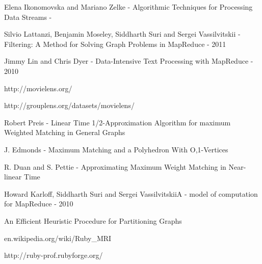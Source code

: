  \begin{thebibliography}{99}

  Elena Ikonomovska and Mariano Zelke - Algorithmic Techniques for Processing Data Streams -

  Silvio Lattanzi, Benjamin Moseley, Siddharth Suri and Sergei Vassilvitskii -Filtering: A Method for Solving Graph Problems in MapReduce - 2011
  
  Jimmy Lin and Chris Dyer - Data-Intensive Text Processing with MapReduce - 2010
  
  http://movielens.org/
  
  http://grouplens.org/datasets/movielens/
  
  Robert Preis - Linear Time 1/2-Approximation Algorithm for maximum Weighted Matching in General Graphs
  
  J. Edmonds - Maximum Matching and a Polyhedron With O,1-Vertices

  R. Duan and S. Pettie - Approximating Maximum Weight Matching in Near-linear Time

  Howard Karloff, Siddharth Suri and Sergei VassilvitskiiA -  model of computation for MapReduce - 2010

  An Efficient Heuristic Procedure for Partitioning Graphs
  
  en.wikipedia.org/wiki/Ruby\_MRI
  
  http://ruby-prof.rubyforge.org/
  
  \end{thebibliography}
